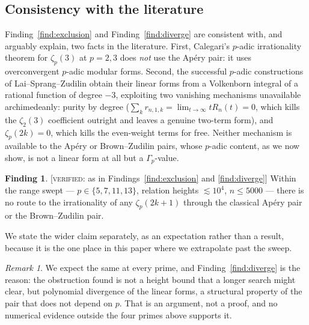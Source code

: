 \documentclass[11pt,reqno]{article}
\newcommand{\Gp}{\Gamma_p}
\newcommand{\PROVED}{{\normalfont\textsc{[proved]}}}
\newcommand{\VER}[1]{{\normalfont\textsc{[verified:} #1\textsc{]}}}
\theoremstyle{plain}
\theoremstyle{definition}
\newtheorem{finding}[theorem]{Finding}
\theoremstyle{remark}
\newtheorem{remark}[theorem]{Remark}
\numberwithin{equation}{section}
\begin{document}
\subsection{Consistency with the literature}\label{ss:consistency}

Finding~\ref{find:exclusion} and Finding~\ref{find:diverge} are consistent with,
and arguably explain, two facts in the literature.  First, Calegari's $p$-adic
irrationality theorem for $\zeta_p(3)$ at $p=2,3$ \cite{Calegari2005} does
\emph{not} use the Ap\'ery pair: it uses overconvergent $p$-adic modular forms.
Second, the successful $p$-adic constructions of Lai--Sprang--Zudilin
\cite{LSZ2025} obtain their linear forms from a Volkenborn integral of a
rational function of degree $-3$, exploiting two vanishing mechanisms
unavailable archimedeanly: purity by degree
($\sum_kr_{n,1,k}=\lim_{t\to\infty}tR_n(t)=0$, which kills the $\zeta_2(3)$
coefficient outright and leaves a genuine two-term form), and $\zeta_p(2k)=0$,
which kills the even-weight terms for free.  Neither mechanism is available to
the Ap\'ery or Brown--Zudilin pairs, whose $p$-adic content, as we now show, is
not a linear form at all but a $\Gp$-value.

\begin{finding}\label{cor:noroute}
\VER{as in Findings~\ref{find:exclusion} and \ref{find:diverge}}
Within the range swept --- $p\in\{5,7,11,13\}$, relation heights $\lesssim10^{4}$,
$n\le5000$ --- there is no route to the irrationality of any $\zeta_p(2k+1)$ through the
classical Ap\'ery pair or the Brown--Zudilin pair.
\end{finding}

We state the wider claim separately, as an expectation rather than a result, because it is the
one place in this paper where we extrapolate past the sweep.

\begin{remark}
We expect the same at every prime, and Finding~\ref{find:diverge} is the reason: the
obstruction found is not a height bound that a longer search might clear, but polynomial
divergence of the linear forms, a structural property of the pair that does not depend on $p$.
That is an argument, not a proof, and no numerical evidence outside the four primes above
supports it.
\end{remark}
\end{document}
